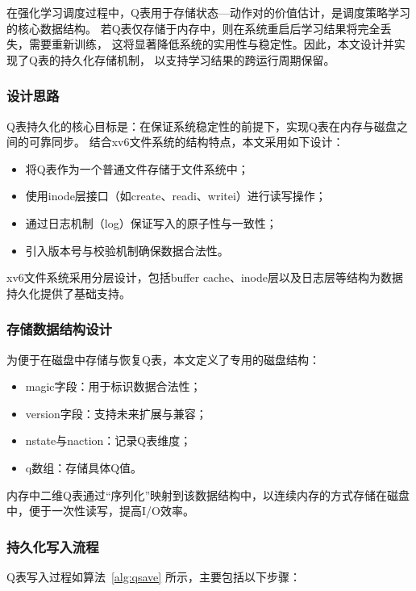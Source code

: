 在强化学习调度过程中，Q表用于存储状态—动作对的价值估计，是调度策略学习的核心数据结构。
若Q表仅存储于内存中，则在系统重启后学习结果将完全丢失，需要重新训练，
这将显著降低系统的实用性与稳定性。因此，本文设计并实现了Q表的持久化存储机制，
以支持学习结果的跨运行周期保留。

\subsubsection{设计思路}

Q表持久化的核心目标是：在保证系统稳定性的前提下，实现Q表在内存与磁盘之间的可靠同步。
结合xv6文件系统的结构特点，本文采用如下设计：

\begin{itemize}
    \item 将Q表作为一个普通文件存储于文件系统中；
    \item 使用inode层接口（如create、readi、writei）进行读写操作；
    \item 通过日志机制（log）保证写入的原子性与一致性；
    \item 引入版本号与校验机制确保数据合法性。
\end{itemize}

xv6文件系统采用分层设计，包括buffer cache、inode层以及日志层等结构为数据持久化提供了基础支持。

\subsubsection{存储数据结构设计}

为便于在磁盘中存储与恢复Q表，本文定义了专用的磁盘结构：

\begin{itemize}
    \item magic字段：用于标识数据合法性；
    \item version字段：支持未来扩展与兼容；
    \item nstate与naction：记录Q表维度；
    \item q数组：存储具体Q值。
\end{itemize}

内存中二维Q表通过“序列化”映射到该数据结构中，以连续内存的方式存储在磁盘中，便于一次性读写，提高I/O效率。

\subsubsection{持久化写入流程}

Q表写入过程如算法~\ref{alg:qsave} 所示，主要包括以下步骤：

